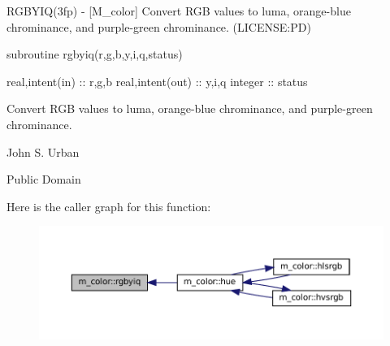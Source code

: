 \begin{DoxyDescription}
\item[\label{_RGBYIQ}%
N\+A\+ME ]R\+G\+B\+Y\+I\+Q(3fp) -\/ \mbox{[}M\+\_\+color\mbox{]} Convert R\+GB values to luma, orange-\/blue chrominance, and purple-\/green chrominance. (L\+I\+C\+E\+N\+SE\+:PD) 


\item[S\+Y\+N\+O\+P\+S\+IS ]
\begin{DoxyPre}
    subroutine rgbyiq(r,g,b,y,i,q,status)\end{DoxyPre}



\begin{DoxyPre}     real,intent(in)  :: r,g,b
     real,intent(out) :: y,i,q
     integer          :: status
    \end{DoxyPre}
 


\item[D\+E\+S\+C\+R\+I\+P\+T\+I\+ON ]Convert R\+GB values to luma, orange-\/blue chrominance, and purple-\/green chrominance. 


\item[A\+U\+T\+H\+OR ]

John S. Urban




\item[L\+I\+C\+E\+N\+SE ]

Public Domain




\end{DoxyDescription}Here is the caller graph for this function\+:
\nopagebreak
\begin{figure}[H]
\begin{center}
\leavevmode
\includegraphics[width=350pt]{namespacem__color_a386d004a1392b7e01ff66f1676d43def_icgraph}
\end{center}
\end{figure}
\mbox{\label{namespacem__color_ac9cd845fb9975144a6deb3a21ce29a29}} 
